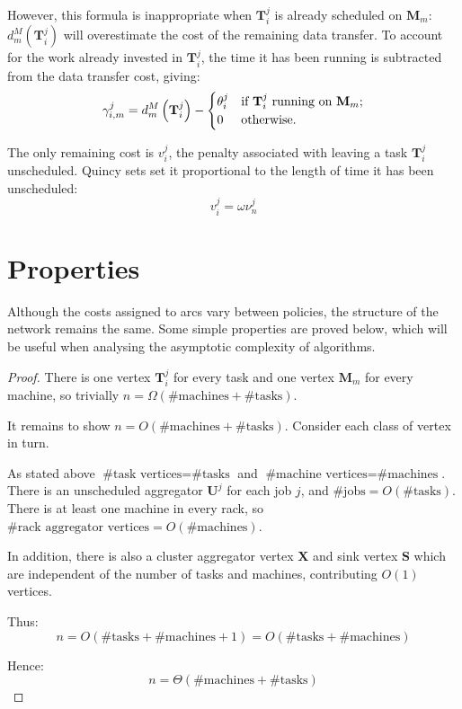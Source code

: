 However, this formula is inappropriate when $\mathbf{T}_{i}^{j}$ is already scheduled on  $\mathbf{M}_m$: $d^M_m\left(\mathbf{T}_{i}^{j}\right)$ will overestimate the cost of the remaining data transfer. To account for the work already invested in $\mathbf{T}_{i}^{j}$, the time it has been running is subtracted from the data transfer cost, giving:
\[\gamma_{i,m}^{j} = d_{m}^{M}\left(\mathbf{T}_{i}^{j}\right)-\begin{cases}
\theta_{i}^{j} & \text{if \ensuremath{\mathbf{T}_{i}^{j}} running on \ensuremath{\mathbf{M}_{m}};}\\
0 & \text{otherwise.}
\end{cases}\]

The only remaining cost is $v_i^j$, the penalty associated with leaving a task $\mathbf{T}_{i}^{j}$ unscheduled. Quincy sets set it proportional to the length of time it has been unscheduled:
\[v_i^j = \omega\nu_{n}^{j}\]

\section{Properties} \label{appendix:flow-scheduling:properties}

Although the costs assigned to arcs vary between policies, the structure of the network remains the same. Some simple properties are proved below, which will be useful when analysing the asymptotic complexity of algorithms. \\

\flowschedulingnumvertices*
\begin{proof}
There is one vertex $\mathbf{T}_i^j$ for every task and one vertex $\mathbf{M}_m$ for every machine, so trivially $n = \Omega\left(\text{\# machines} + \text{\# tasks}\right)$.

It remains to show $n = O\left(\text{\# machines} + \text{\# tasks}\right)$. Consider each class of vertex in turn.

As stated above $\text{\# task vertices} = \text{\# tasks}$ and $\text{\# machine vertices} = \text{\# machines}$. There is an unscheduled aggregator $\mathbf{U}^j$ for each job $j$, and $\text{\# jobs} = O\left(\text{\# tasks}\right)$. There is at least one machine in every rack, so $\text{\# rack aggregator vertices} = O\left(\text{\# machines}\right)$. 

In addition, there is also a cluster aggregator vertex $\mathbf{X}$ and sink vertex $\mathbf{S}$ which are independent of the number of tasks and machines, contributing $O(1)$ vertices.

Thus:
\[n = O\left(\text{\# tasks} + \text{\# machines} + 1\right) = O\left(\text{\# tasks} + \text{\# machines}\right)\]

Hence:
\[n = \Theta\left(\text{\# machines} + \text{\# tasks}\right)\]
\end{proof}

